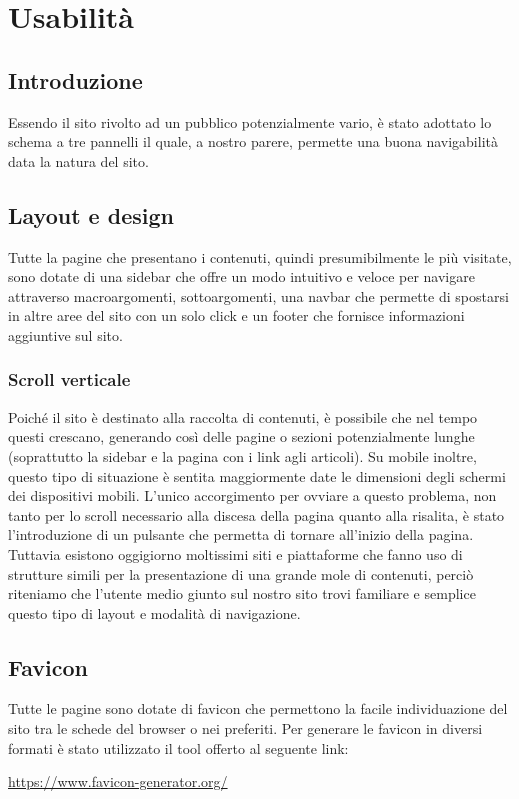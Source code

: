 \documentclass[12pt]{article}
\begin{document}
	\section{Usabilità}
	\subsection{Introduzione}
	Essendo il sito rivolto ad un pubblico potenzialmente vario, è stato adottato lo schema a tre pannelli il quale, a nostro parere, permette una buona navigabilità data la natura del sito.
	\subsection{Layout e design}
	Tutte la pagine che presentano i contenuti, quindi presumibilmente le più visitate, sono dotate di una sidebar che offre un modo intuitivo e veloce per navigare attraverso macroargomenti, sottoargomenti, una navbar che permette di spostarsi in altre aree del sito con un solo click e un footer che fornisce informazioni aggiuntive sul sito.
	\subsubsection{Scroll verticale}
	Poiché il sito è destinato alla raccolta di contenuti, è possibile che nel tempo questi crescano, generando così delle pagine o sezioni potenzialmente lunghe (soprattutto la sidebar e la pagina con i link agli articoli). Su mobile inoltre, questo tipo di situazione è sentita maggiormente date le dimensioni degli schermi dei dispositivi mobili. L'unico accorgimento per ovviare a questo problema, non tanto per lo scroll necessario alla discesa della pagina quanto alla risalita, è stato l'introduzione di un pulsante che permetta di tornare all'inizio della pagina. Tuttavia esistono oggigiorno moltissimi siti e piattaforme che fanno uso di strutture simili per la presentazione di una grande mole di contenuti, perciò riteniamo che l'utente medio giunto sul nostro sito trovi familiare e semplice questo tipo di layout e modalità di navigazione.
	
	\subsection{Favicon}
	Tutte le pagine sono dotate di favicon che permettono la facile individuazione del sito tra le schede del browser o nei preferiti. Per generare le favicon in diversi formati è stato utilizzato il tool offerto al seguente link:
	\begin{center} 
		\url{https://www.favicon-generator.org/} 
	\end{center}
	
\end{document}

